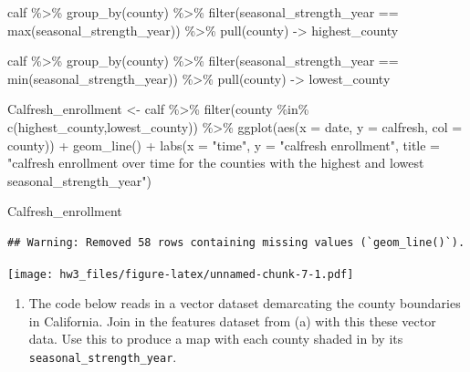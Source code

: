 \documentclass[
]{article}
\newenvironment{Shaded}{\begin{snugshade}}{\end{snugshade}}
\newcommand{\AttributeTok}[1]{\textcolor[rgb]{0.77,0.63,0.00}{#1}}
\newcommand{\FunctionTok}[1]{\textcolor[rgb]{0.00,0.00,0.00}{#1}}
\newcommand{\NormalTok}[1]{#1}
\newcommand{\OtherTok}[1]{\textcolor[rgb]{0.56,0.35,0.01}{#1}}
\newcommand{\SpecialCharTok}[1]{\textcolor[rgb]{0.00,0.00,0.00}{#1}}
\newcommand{\StringTok}[1]{\textcolor[rgb]{0.31,0.60,0.02}{#1}}
\providecommand{\tightlist}{%
  \setlength{\itemsep}{0pt}\setlength{\parskip}{0pt}}
\begin{document}
\begin{Shaded}
\begin{Highlighting}[]
\NormalTok{calf }\SpecialCharTok{\%\textgreater{}\%}
  \FunctionTok{group\_by}\NormalTok{(county) }\SpecialCharTok{\%\textgreater{}\%}
  \FunctionTok{filter}\NormalTok{(seasonal\_strength\_year }\SpecialCharTok{==} \FunctionTok{max}\NormalTok{(seasonal\_strength\_year)) }\SpecialCharTok{\%\textgreater{}\%}
  \FunctionTok{pull}\NormalTok{(county) }\OtherTok{{-}\textgreater{}}\NormalTok{ highest\_county}

\NormalTok{calf }\SpecialCharTok{\%\textgreater{}\%}
  \FunctionTok{group\_by}\NormalTok{(county) }\SpecialCharTok{\%\textgreater{}\%}
  \FunctionTok{filter}\NormalTok{(seasonal\_strength\_year }\SpecialCharTok{==} \FunctionTok{min}\NormalTok{(seasonal\_strength\_year)) }\SpecialCharTok{\%\textgreater{}\%}
  \FunctionTok{pull}\NormalTok{(county) }\OtherTok{{-}\textgreater{}}\NormalTok{ lowest\_county}

\NormalTok{Calfresh\_enrollment }\OtherTok{\textless{}{-}}\NormalTok{ calf }\SpecialCharTok{\%\textgreater{}\%}
  \FunctionTok{filter}\NormalTok{(county }\SpecialCharTok{\%in\%} \FunctionTok{c}\NormalTok{(highest\_county,lowest\_county)) }\SpecialCharTok{\%\textgreater{}\%}
  \FunctionTok{ggplot}\NormalTok{(}\FunctionTok{aes}\NormalTok{(}\AttributeTok{x =}\NormalTok{ date, }\AttributeTok{y =}\NormalTok{ calfresh, }\AttributeTok{col =}\NormalTok{ county)) }\SpecialCharTok{+}
  \FunctionTok{geom\_line}\NormalTok{() }\SpecialCharTok{+}
  \FunctionTok{labs}\NormalTok{(}\AttributeTok{x =} \StringTok{"time"}\NormalTok{, }\AttributeTok{y =} \StringTok{"calfresh enrollment"}\NormalTok{,}
       \AttributeTok{title =} \StringTok{"calfresh enrollment over time for the counties with the highest and}
\StringTok{    lowest \textasciigrave{}seasonal\_strength\_year\textasciigrave{}"}\NormalTok{)}

\NormalTok{Calfresh\_enrollment}
\end{Highlighting}
\end{Shaded}

\begin{verbatim}
## Warning: Removed 58 rows containing missing values (`geom_line()`).
\end{verbatim}

\texttt{[image: hw3\_files/figure-latex/unnamed-chunk-7-1.pdf]}

\begin{enumerate}
\def\labelenumi{\alph{enumi}.}
\setcounter{enumi}{2}
\tightlist
\item
  The code below reads in a vector dataset demarcating the county
  boundaries in California. Join in the features dataset from (a) with
  this these vector data. Use this to produce a map with each county
  shaded in by its \texttt{seasonal\_strength\_year}.
\end{enumerate}
\end{document}
